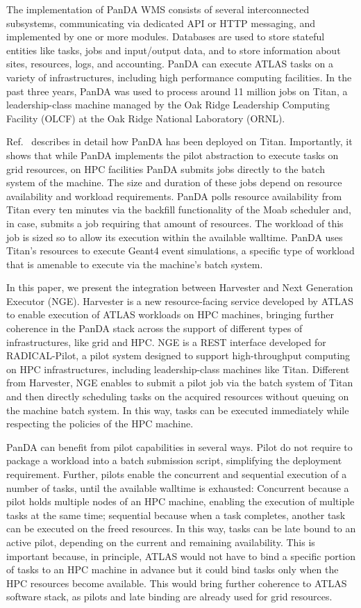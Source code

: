 \documentclass{webofc}
\begin{document}
The implementation of PanDA WMS consists of several interconnected
subsystems, communicating via dedicated API or HTTP messaging, and
implemented by one or more modules. Databases are used to store stateful
entities like tasks, jobs and input/output data, and to store information
about sites, resources, logs, and accounting. PanDA can execute ATLAS tasks
on a variety of infrastructures, including high performance computing
facilities. In the past three years, PanDA was used to process around 11 million
jobs on Titan, a leadership-class machine managed by the Oak Ridge Leadership
Computing Facility (OLCF) at the Oak Ridge National Laboratory (ORNL).

Ref.~\cite{Doleynik2017high} describes in detail how PanDA has been deployed
on Titan. Importantly, it shows that while PanDA implements the pilot
abstraction to execute tasks on grid resources, on HPC facilities PanDA
submits jobs directly to the batch system of the machine. The size and
duration of these jobs depend on resource availability and workload
requirements. PanDA polls resource availability from Titan every ten minutes
via the backfill functionality of the Moab scheduler and, in case, submits a
job requiring that amount of resources. The workload of this job is sized so
to allow its execution within the available walltime. PanDA uses Titan’s
resources to execute Geant4 event simulations, a specific type of workload
that is amenable to execute via the machine’s batch system.

In this paper, we present the integration between Harvester and Next
Generation Executor (NGE). Harvester is a new resource-facing service
developed by ATLAS to enable execution of ATLAS workloads on HPC machines,
bringing further coherence in the PanDA stack across the support of different
types of infrastructures, like grid and HPC. NGE is a REST interface
developed for RADICAL-Pilot, a pilot system designed to support
high-throughput computing on HPC infrastructures, including leadership-class
machines like Titan. Different from Harvester, NGE enables to submit a pilot
job via the batch system of Titan and then directly scheduling tasks on the
acquired resources without queuing on the machine batch system. In this way,
tasks can be executed immediately while respecting the policies of the HPC
machine.

PanDA can benefit from pilot capabilities in several ways. Pilot do not
require to package a workload into a batch submission script, simplifying the
deployment requirement. Further, pilots enable the concurrent and sequential
execution of a number of tasks, until the available walltime is exhausted:
Concurrent because a pilot holds multiple nodes of an HPC machine, enabling
the execution of multiple tasks at the same time; sequential because when a
task completes, another task can be executed on the freed resources. In this
way, tasks can be late bound to an active pilot, depending on the current and
remaining availability. This is important because, in principle, ATLAS would
not have to bind a specific portion of tasks to an HPC machine in advance but
it could bind tasks only when the HPC resources become available. This would
bring further coherence to ATLAS software stack, as pilots and late binding
are already used for grid resources.
\end{document}
